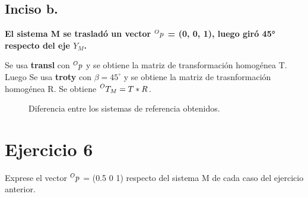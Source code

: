 \documentclass[a4paper,12pt]{article}
\begin{document}
\subsection{Inciso b.}
\textbf{El sistema {M} se trasladó un vector  $\prescript{O}{}{p}$ = (0, 0, 1), luego giró 45° respecto del eje $Y_M$.}
\vspace{0.5 cm}

Se usa \textbf{transl} con $\prescript{O}{}{p}$ y se obtiene la matriz de transformación homogénea T.
Luego Se usa \textbf{troty} con $\beta = 45^\circ$ y se obtiene la matriz de trasnformación homogénea R.
Se obtiene $\prescript{O}{}{T_M} = T*R$.

\begin{figure}[H]
    \centering
    \begin{adjustbox}{scale = 0.85, max width=\columnwidth}
    \end{adjustbox}
    \caption{Diferencia entre los sistemas de referencia obtenidos.}
\end{figure}

\section{Ejercicio 6}
Exprese el vector $\prescript{O}{}{p}$ = (0.5 0 1) respecto del sistema {M} de cada caso del
ejercicio anterior.
\end{document}
